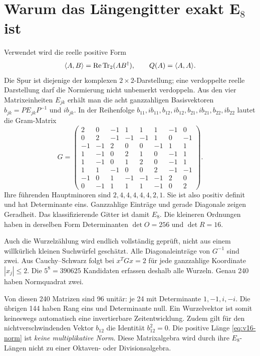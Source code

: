\section{Warum das Längengitter exakt E\texorpdfstring{$_8$}{8} ist}
Verwendet wird die reelle positive Form
\begin{equation}
\langle A,B\rangle=\operatorname{Re}\operatorname{Tr}_2(AB^\dagger),\qquad Q(A)=\langle A,A\rangle.
\label{eq:v16-norm}
\end{equation}
Die Spur ist diejenige der komplexen $2\times2$-Darstellung; eine verdoppelte reelle Darstellung darf die Normierung nicht unbemerkt verdoppeln. Aus den vier Matrixeinheiten $E_{jk}$ erhält man die acht ganzzahligen Basisvektoren $b_{jk}=PE_{jk}P^{-1}$ und $ib_{jk}$. In der Reihenfolge $b_{11},ib_{11},b_{12},ib_{12},b_{21},ib_{21},b_{22},ib_{22}$ lautet die Gram-Matrix
\begin{equation}
G=\begin{pmatrix}
2&0&-1&1&1&1&-1&0\\
0&2&-1&-1&-1&1&0&-1\\
-1&-1&2&0&0&-1&1&1\\
1&-1&0&2&1&0&-1&1\\
1&-1&0&1&2&0&-1&1\\
1&1&-1&0&0&2&-1&-1\\
-1&0&1&-1&-1&-1&2&0\\
0&-1&1&1&1&-1&0&2
\end{pmatrix}.
\end{equation}
Ihre führenden Hauptminoren sind $2,4,4,4,4,4,2,1$. Sie ist also positiv definit und hat Determinante eins. Ganzzahlige Einträge und gerade Diagonale zeigen Geradheit. Das klassifizierende Gitter ist damit $E_8$. Die kleineren Ordnungen haben in derselben Form Determinanten $\det O=256$ und $\det R=16$.

Auch die Wurzelzählung wird endlich vollständig geprüft, nicht aus einem willkürlich kleinen Suchwürfel geschätzt. Alle Diagonaleinträge von $G^{-1}$ sind zwei. Aus Cauchy--Schwarz folgt bei $x^TGx=2$ für jede ganzzahlige Koordinate $|x_j|\le2$. Die $5^8=390625$ Kandidaten erfassen deshalb alle Wurzeln. Genau 240 haben Normquadrat zwei.

Von diesen 240 Matrizen sind 96 unitär: je 24 mit Determinante $1,-1,i,-i$. Die übrigen 144 haben Rang eins und Determinante null. Ein Wurzelvektor ist somit keineswegs automatisch eine invertierbare Zeitentwicklung. Zudem gilt für den nichtverschwindenden Vektor $b_{12}$ die Identität $b_{12}^2=0$. Die positive Länge \eqref{eq:v16-norm} ist \emph{keine multiplikative Norm}. Diese Matrixalgebra wird durch ihre $E_8$-Längen nicht zu einer Oktaven- oder Divisionsalgebra.

